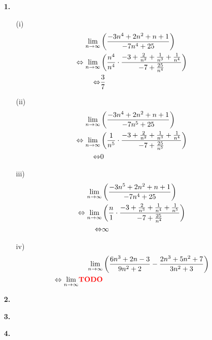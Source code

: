 \documentclass [a4paper,11pt]{article}
\author{\authorinfotitle}
\title{\titleinfo}
\date{\today}
\begin{document}
\maketitle
    \begin{enumerate}
        \item[\textbf{1.}]
            \begin{enumerate}
                \item[(i)]
                    \begin{align}
                        \underset{n \to \infty}{\lim}
                        &\left( \frac{-3n^4+2n^2+n+1}{-7n^4+25} \right) \\
                        \Leftrightarrow \underset{n \to \infty}{\lim}
                        &\left( \frac{n^4}{n^4} \cdot \frac{-3+ \frac{2}{n^2} + \frac{1}{n^3} + \frac{1}{n^4}}{-7+ \frac{25}{n^4}} \right) \\
                        \Leftrightarrow &\frac{3}{7}
                    \end{align}
                \item[(ii)]
                    \begin{align}
                        \limp
                        &\left( \frac{-3n^4+2n^2+n+1}{-7n^5+25} \right) \\
                        \Leftrightarrow \limp
                        &\left( \frac{1}{n^5} \cdot \frac{-3+ \frac{2}{n^2} + \frac{1}{n^3} + \frac{1}{n^4}}{-7+ \frac{25}{n^5}} \right) \\
                        \Leftrightarrow &0 %
                    \end{align}
                \item[iii)]
                    \begin{align}
                        \underset{n \to \infty}{\lim}
                        &\left( \frac{-3n^5+2n^2+n+1}{-7n^4+25} \right) \\
                        \Leftrightarrow \underset{n \to \infty}{\lim}
                        &\left( \frac{n}{1} \cdot \frac{-3+ \frac{2}{n^3} + \frac{1}{n^4} + \frac{1}{n^5}}{-7+ \frac{25}{n^4}} \right) \\
                        \Leftrightarrow &\infty
                    \end{align}
                \item[iv)]
                    \begin{align}
                        \underset{n \to \infty}{\lim}
                        &\left( \frac{6n^3+2n-3}{9n^2+2} - \frac{2n^3+5n^2+7}{3n^2+3} \right) \\
                        \Leftrightarrow \underset{n \to \infty}{\lim}
                        \textbf{\textcolor{red}{TODO}}
                    \end{align}
            \end{enumerate}
        \item[\textbf{2.}]
            
        \item[\textbf{3.}]

        \item[\textbf{4.}]

    \end{enumerate}
\end{document}
